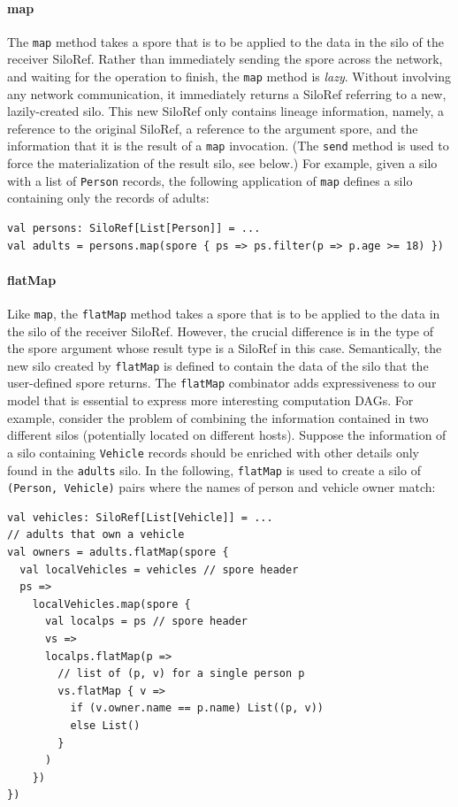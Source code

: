 \documentclass{sigplanconf}
\theoremstyle{definition}
\theoremstyle{definition}
\begin{document}
\paragraph{map}
The \verb|map| method takes a spore that is to be applied to the data in the
silo of the receiver SiloRef. Rather than immediately sending the spore across
the network, and waiting for the operation to finish, the \verb|map| method is
\emph{lazy}. Without involving any network communication, it immediately
returns a SiloRef referring to a new, lazily-created silo. This new SiloRef
only contains lineage information, namely, a reference to the original
SiloRef, a reference to the argument spore, and the information that it is the
result of a \verb|map| invocation. (The \verb|send| method is used to force
the materialization of the result silo, see below.) For example, given a silo
with a list of \verb|Person| records, the following application of \verb|map|
defines a silo containing only the records of adults:

\begin{lstlisting}
val persons: SiloRef[List[Person]] = ...
val adults = persons.map(spore { ps => ps.filter(p => p.age >= 18) })
\end{lstlisting}

\paragraph{flatMap}
Like \verb|map|, the \verb|flatMap| method takes a spore that is to be applied
to the data in the silo of the receiver SiloRef. However, the crucial
difference is in the type of the spore argument whose result type is a SiloRef
in this case. Semantically, the new silo created by \verb|flatMap| is defined
to contain the data of the silo that the user-defined spore returns. The
\verb|flatMap| combinator adds expressiveness to our model that is essential
to express more interesting computation DAGs. For example, consider the
problem of combining the information contained in two different silos
(potentially located on different hosts). Suppose the information of a silo
containing \verb|Vehicle| records should be enriched with other details only
found in the \verb|adults| silo. In the following, \verb|flatMap| is used to
create a silo of \verb|(Person, Vehicle)| pairs where the names of person and
vehicle owner match:

\begin{lstlisting}
val vehicles: SiloRef[List[Vehicle]] = ...
// adults that own a vehicle
val owners = adults.flatMap(spore {
  val localVehicles = vehicles // spore header
  ps =>
    localVehicles.map(spore {
      val localps = ps // spore header
      vs =>
      localps.flatMap(p =>
        // list of (p, v) for a single person p
        vs.flatMap { v =>
          if (v.owner.name == p.name) List((p, v))
          else List()
        }
      )
    })
})
\end{lstlisting}
\end{document}
